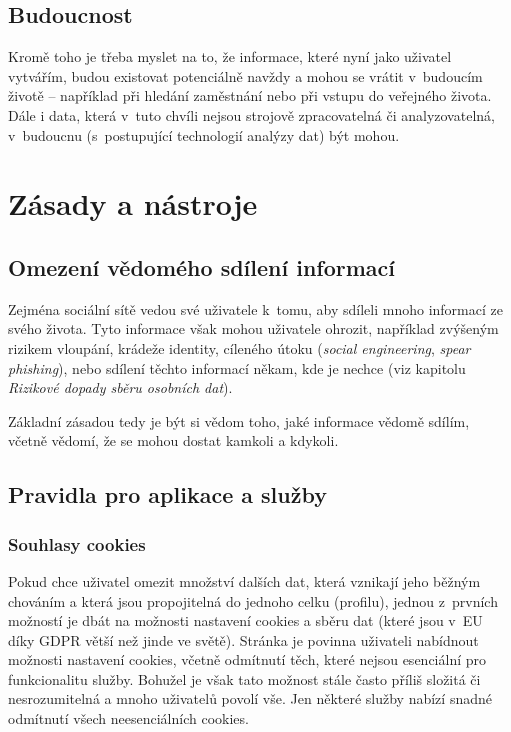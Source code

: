 \subsection{Budoucnost}
Kromě toho je třeba myslet na to, že informace, které nyní jako uživatel vytvářím, budou existovat potenciálně navždy a mohou se vrátit v~budoucím životě -- například při hledání zaměstnání nebo při vstupu do veřejného života. 
Dále i data, která v~tuto chvíli nejsou strojově zpracovatelná či analyzovatelná, v~budoucnu (s~postupující technologií analýzy dat) být mohou.


\section{Zásady a nástroje}

\subsection{Omezení vědomého sdílení informací}
Zejména sociální sítě vedou své uživatele k~tomu, aby sdíleli mnoho informací ze svého života. Tyto informace však mohou uživatele ohrozit, například zvýšeným rizikem vloupání, krádeže identity, cíleného útoku (\textit{social engineering}, \textit{spear phishing}), nebo sdílení těchto informací někam, kde je nechce (viz kapitolu \textit{Rizikové dopady sběru osobních dat}).

Základní zásadou tedy je být si vědom toho, jaké informace vědomě sdílím, včetně vědomí, že se mohou dostat kamkoli a kdykoli.

\subsection{Pravidla pro aplikace a služby}
\subsubsection*{Souhlasy cookies}

Pokud chce uživatel omezit množství dalších dat, která vznikají jeho běžným chováním a která jsou propojitelná do jednoho celku (profilu), jednou z~prvních možností je dbát na možnosti nastavení cookies a sběru dat (které jsou v~EU díky GDPR větší než jinde ve světě). Stránka je povinna uživateli nabídnout možnosti nastavení cookies, včetně odmítnutí těch, které nejsou esenciální pro funkcionalitu služby.
Bohužel je však tato možnost stále často příliš složitá či nesrozumitelná a mnoho uživatelů povolí vše. Jen některé služby nabízí snadné odmítnutí všech neesenciálních cookies.\\

